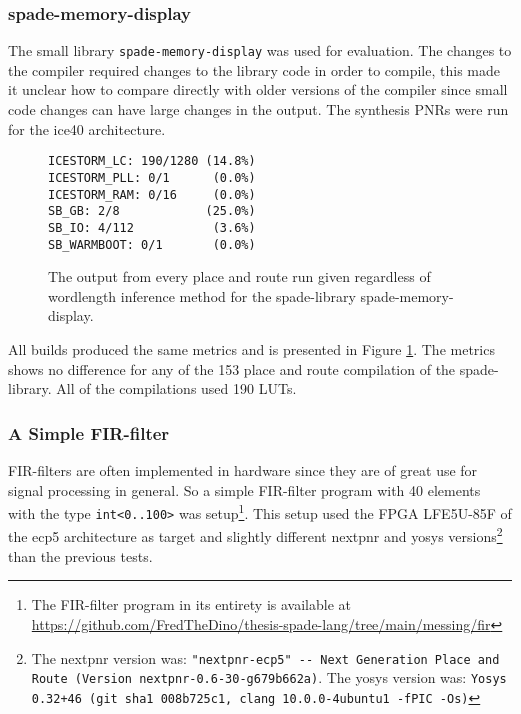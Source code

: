 \subsubsection{spade-memory-display}
The small library \verb+spade-memory-display+ was used for evaluation. The changes to the compiler required changes to the library code in order to compile, this made it unclear how to compare directly with older versions of the compiler since small code changes can have large changes in the output. The synthesis PNRs were run for the ice40 architecture.
 
\begin{figure}[h!]
\begin{center}
\begin{verbatim}
ICESTORM_LC: 190/1280 (14.8%)
ICESTORM_PLL: 0/1      (0.0%)
ICESTORM_RAM: 0/16     (0.0%)
SB_GB: 2/8            (25.0%)
SB_IO: 4/112           (3.6%)
SB_WARMBOOT: 0/1       (0.0%)
\end{verbatim}
\end{center}

  \caption{The output from every place and route run given regardless of wordlength inference method for the spade-library spade-memory-display.}
  \label{fig:SMDoutput}
\end{figure}

All builds produced the same metrics and is presented in Figure \ref{fig:SMDoutput}. The metrics shows no difference for any of the 153 place and route compilation of the spade-library. All of the compilations used 190 LUTs. 

\subsubsection{A Simple FIR-filter}
FIR-filters are often implemented in hardware since they are of great use for signal processing in general. So a simple FIR-filter program with 40 elements with the type \verb+int<0..100>+ was setup\cprotect\footnote{The FIR-filter program in its entirety is available at \href{https://github.com/FredTheDino/thesis-spade-lang/tree/main/messing/fir}{https://github.com/FredTheDino/thesis-spade-lang/tree/main/messing/fir}}. This setup used the FPGA LFE5U-85F of the ecp5 architecture as target and slightly different nextpnr and yosys versions\cprotect\footnote{The nextpnr version was: \verb+"nextpnr-ecp5" -- Next Generation Place and Route (Version nextpnr-0.6-30-g679b662a)+. The yosys version was: \verb!Yosys 0.32+46 (git sha1 008b725c1, clang 10.0.0-4ubuntu1 -fPIC -Os)!} than the previous tests.

